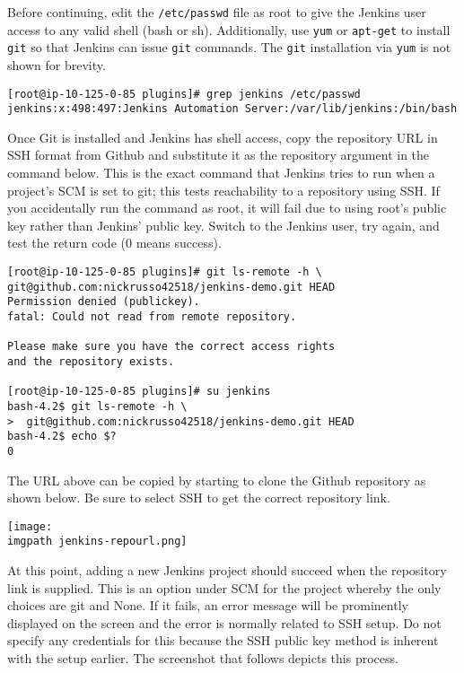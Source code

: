Before continuing, edit the \verb|/etc/passwd| file as root to give the
Jenkins user access to any valid shell (bash or sh). Additionally, use \verb|yum|
or \verb|apt-get| to install \verb|git| so that Jenkins can issue \verb|git|
commands. The \verb|git| installation via \verb|yum| is not shown for brevity.

\begin{verbatim}
[root@ip-10-125-0-85 plugins]# grep jenkins /etc/passwd
jenkins:x:498:497:Jenkins Automation Server:/var/lib/jenkins:/bin/bash
\end{verbatim}

Once Git is installed and Jenkins has shell access, copy the repository URL in
SSH format from Github and substitute it as the repository argument in the
command below. This is the exact command that Jenkins tries to run when a
project's SCM is set to git; this tests reachability to a repository using
SSH. If you accidentally run the command as root, it will fail due to using
root's public key rather than Jenkins' public key. Switch to the Jenkins user,
try again, and test the return code (0 means success).

\begin{verbatim}
[root@ip-10-125-0-85 plugins]# git ls-remote -h \
git@github.com:nickrusso42518/jenkins-demo.git HEAD
Permission denied (publickey).
fatal: Could not read from remote repository.

Please make sure you have the correct access rights
and the repository exists.

[root@ip-10-125-0-85 plugins]# su jenkins
bash-4.2$ git ls-remote -h \
>  git@github.com:nickrusso42518/jenkins-demo.git HEAD
bash-4.2$ echo $?
0
\end{verbatim}

The URL above can be copied by starting to clone the Github repository as
shown below. Be sure to select SSH to get the correct repository link.

    \begin{minipage}[t]{\linewidth}
	  \centering
      \texttt{[image: \\imgpath jenkins-repourl.png]}
    \end{minipage}

At this point, adding a new Jenkins project should succeed when the repository
link is supplied. This is an option under SCM for the project whereby the only
choices are git and None. If it fails, an error message will be prominently
displayed on the screen and the error is normally related to SSH setup. Do not
specify any credentials for this because the SSH public key method is inherent
with the setup earlier. The screenshot that follows depicts this process.

